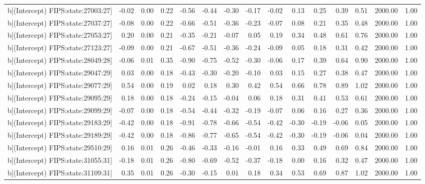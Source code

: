 \begin{table}[ht]
\begin{tabular}{rrrrrrrrrrrrrrr}
  b[(Intercept) FIPS:state:27003:27] & -0.02 & 0.00 & 0.22 & -0.56 & -0.44 & -0.30 & -0.17 & -0.02 & 0.13 & 0.25 & 0.39 & 0.51 & 2000.00 & 1.00 \\ 
  b[(Intercept) FIPS:state:27037:27] & -0.08 & 0.00 & 0.22 & -0.66 & -0.51 & -0.36 & -0.23 & -0.07 & 0.08 & 0.21 & 0.35 & 0.48 & 2000.00 & 1.00 \\ 
  b[(Intercept) FIPS:state:27053:27] & 0.20 & 0.00 & 0.21 & -0.35 & -0.21 & -0.07 & 0.05 & 0.19 & 0.34 & 0.48 & 0.61 & 0.76 & 2000.00 & 1.00 \\ 
  b[(Intercept) FIPS:state:27123:27] & -0.09 & 0.00 & 0.21 & -0.67 & -0.51 & -0.36 & -0.24 & -0.09 & 0.05 & 0.18 & 0.31 & 0.42 & 2000.00 & 1.00 \\ 
  b[(Intercept) FIPS:state:28049:28] & -0.06 & 0.01 & 0.35 & -0.90 & -0.75 & -0.52 & -0.30 & -0.06 & 0.17 & 0.39 & 0.64 & 0.90 & 2000.00 & 1.00 \\ 
  b[(Intercept) FIPS:state:29047:29] & 0.03 & 0.00 & 0.18 & -0.43 & -0.30 & -0.20 & -0.10 & 0.03 & 0.15 & 0.27 & 0.38 & 0.47 & 2000.00 & 1.00 \\ 
  b[(Intercept) FIPS:state:29077:29] & 0.54 & 0.00 & 0.19 & 0.02 & 0.18 & 0.30 & 0.42 & 0.54 & 0.66 & 0.78 & 0.89 & 1.02 & 2000.00 & 1.00 \\ 
  b[(Intercept) FIPS:state:29095:29] & 0.18 & 0.00 & 0.18 & -0.24 & -0.15 & -0.04 & 0.06 & 0.18 & 0.31 & 0.41 & 0.53 & 0.61 & 2000.00 & 1.00 \\ 
  b[(Intercept) FIPS:state:29099:29] & -0.07 & 0.00 & 0.18 & -0.54 & -0.44 & -0.32 & -0.19 & -0.07 & 0.06 & 0.16 & 0.27 & 0.36 & 2000.00 & 1.00 \\ 
  b[(Intercept) FIPS:state:29183:29] & -0.42 & 0.00 & 0.18 & -0.91 & -0.78 & -0.66 & -0.54 & -0.42 & -0.30 & -0.19 & -0.06 & 0.05 & 2000.00 & 1.00 \\ 
  b[(Intercept) FIPS:state:29189:29] & -0.42 & 0.00 & 0.18 & -0.86 & -0.77 & -0.65 & -0.54 & -0.42 & -0.30 & -0.19 & -0.06 & 0.04 & 2000.00 & 1.00 \\ 
  b[(Intercept) FIPS:state:29510:29] & 0.16 & 0.01 & 0.26 & -0.46 & -0.33 & -0.16 & -0.01 & 0.16 & 0.33 & 0.49 & 0.69 & 0.84 & 2000.00 & 1.00 \\ 
  b[(Intercept) FIPS:state:31055:31] & -0.18 & 0.01 & 0.26 & -0.80 & -0.69 & -0.52 & -0.37 & -0.18 & 0.00 & 0.16 & 0.32 & 0.47 & 2000.00 & 1.00 \\ 
  b[(Intercept) FIPS:state:31109:31] & 0.35 & 0.01 & 0.26 & -0.30 & -0.15 & 0.01 & 0.18 & 0.34 & 0.53 & 0.69 & 0.87 & 1.02 & 2000.00 & 1.00 \\ 

\end{tabular}
\end{table}
